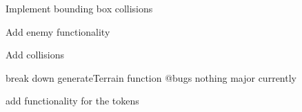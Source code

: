 
\begin{DoxyRefList}
\item[Class \mbox{\hyperlink{class_bounding_box}{Bounding\+Box}} ]\label{todo__todo000001}%
%
Implement bounding box collisions  
\item[Class \mbox{\hyperlink{class_enemy}{Enemy}} ]\label{todo__todo000002}%
%
Add enemy functionality 
\item[Class \mbox{\hyperlink{class_game_object}{Game\+Object}} ]\label{todo__todo000003}%
%
Add collisions 
\item[Class \mbox{\hyperlink{class_terrain}{Terrain}} ]\label{todo__todo000004}%
%
break down generate\+Terrain function @bugs nothing major currently 
\item[Class \mbox{\hyperlink{class_token}{Token}} ]\label{todo__todo000005}%
%
add functionality for the tokens
\end{DoxyRefList}
